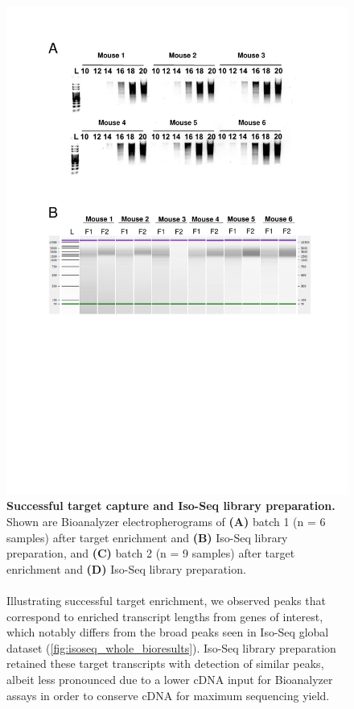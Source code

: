 \begin{figure}[!htp]
	\centering
	\vspace{20pt}
	\includegraphics[page=2,trim={0 15cm 0cm 1cm},clip,scale = 0.75]{Figures/TargetedTranscriptome_LabResults.pdf}
	\captionsetup{width=0.95\textwidth}
	\caption[Iso-Seq targeted profiling - target capture \& SMRTbell library preparation]%
	{\textbf{Successful target capture and Iso-Seq library preparation.} Shown are Bioanalyzer electropherograms of \textbf{(A)} batch 1 (n = 6 samples) after target enrichment and \textbf{(B)} Iso-Seq library preparation, and \textbf{(C)} batch 2 (n = 9 samples) after target enrichment and \textbf{(D)} Iso-Seq library preparation. 
	\\
	\\
	Illustrating successful target enrichment, we observed peaks that correspond to enriched transcript lengths from genes of interest, which notably differs from the broad peaks seen in Iso-Seq global dataset (\cref{fig:isoseq_whole_bioresults}). Iso-Seq library preparation retained these target transcripts with detection of similar peaks, albeit less pronounced due to a lower cDNA input for Bioanalyzer assays in order to conserve cDNA for maximum sequencing yield.}  
	\label{fig:isoseq_targeted_libresults}
\end{figure}

